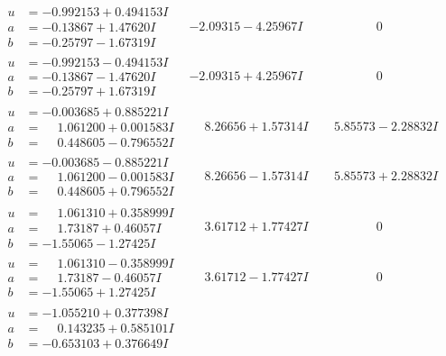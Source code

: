 \documentclass[1p]{elsarticle_modified}
\theoremstyle{definition}
\begin{document}
$$\begin{array}{c|c|c}
\begin{aligned}
u &= -0.992153 + 0.494153 I \\
a &= -0.13867 + 1.47620 I \\
b &= -0.25797 - 1.67319 I\end{aligned}
 & -2.09315 - 4.25967 I & \phantom{-0.000000 } 0 \\ \hline\begin{aligned}
u &= -0.992153 - 0.494153 I \\
a &= -0.13867 - 1.47620 I \\
b &= -0.25797 + 1.67319 I\end{aligned}
 & -2.09315 + 4.25967 I & \phantom{-0.000000 } 0 \\ \hline\begin{aligned}
u &= -0.003685 + 0.885221 I \\
a &= \phantom{-}1.061200 + 0.001583 I \\
b &= \phantom{-}0.448605 - 0.796552 I\end{aligned}
 & \phantom{-}8.26656 + 1.57314 I & \phantom{-}5.85573 - 2.28832 I \\ \hline\begin{aligned}
u &= -0.003685 - 0.885221 I \\
a &= \phantom{-}1.061200 - 0.001583 I \\
b &= \phantom{-}0.448605 + 0.796552 I\end{aligned}
 & \phantom{-}8.26656 - 1.57314 I & \phantom{-}5.85573 + 2.28832 I \\ \hline\begin{aligned}
u &= \phantom{-}1.061310 + 0.358999 I \\
a &= \phantom{-}1.73187 + 0.46057 I \\
b &= -1.55065 - 1.27425 I\end{aligned}
 & \phantom{-}3.61712 + 1.77427 I & \phantom{-0.000000 } 0 \\ \hline\begin{aligned}
u &= \phantom{-}1.061310 - 0.358999 I \\
a &= \phantom{-}1.73187 - 0.46057 I \\
b &= -1.55065 + 1.27425 I\end{aligned}
 & \phantom{-}3.61712 - 1.77427 I & \phantom{-0.000000 } 0 \\ \hline\begin{aligned}
u &= -1.055210 + 0.377398 I \\
a &= \phantom{-}0.143235 + 0.585101 I \\
b &= -0.653103 + 0.376649 I\end{aligned}

\end{array}$$
\end{document}
